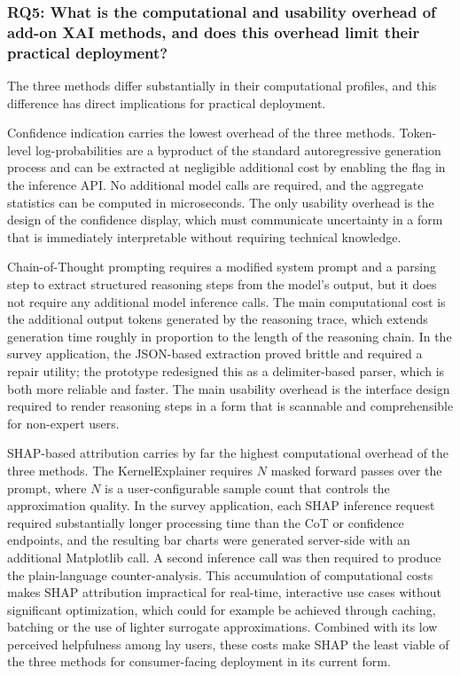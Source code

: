 \subsubsection*{RQ5: What is the computational and usability overhead of add-on XAI methods, and does this overhead limit their practical deployment?}

The three methods differ substantially in their computational profiles, and this difference has direct implications for practical deployment.

Confidence indication carries the lowest overhead of the three methods. Token-level log-probabi\-li\-ties are a byproduct of the standard autoregressive generation process and can be extracted at negligible additional cost by enabling the  flag in the inference API. No additional model calls are required, and the aggregate statistics can be computed in microseconds. The only usability overhead is the design of the confidence display, which must communicate uncertainty in a form that is immediately interpretable without requiring technical knowledge.

Chain-of-Thought prompting requires a modified system prompt and a parsing step to extract structured reasoning steps from the model's output, but it does not require any additional model inference calls. The main computational cost is the additional output tokens generated by the reasoning trace, which extends generation time roughly in proportion to the length of the reasoning chain. In the survey application, the JSON-based extraction proved brittle and required a repair utility; the prototype redesigned this as a delimiter-based parser, which is both more reliable and faster. The main usability overhead is the interface design required to render reasoning steps in a form that is scannable and comprehensible for non-expert users.

SHAP-based attribution carries by far the highest computational overhead of the three methods. The KernelExplainer requires $N$ masked forward passes over the prompt, where $N$ is a user-configurable sample count that controls the approximation quality. In the survey application, each SHAP inference request required substantially longer processing time than the CoT or confidence endpoints, and the resulting bar charts were generated server-side with an additional Matplotlib call. A second inference call was then required to produce the plain-language counter-analysis. This accumulation of computational costs makes SHAP attribution impractical for real-time, interactive use cases without significant optimization, which could for example be achieved through caching, batching or the use of lighter surrogate approximations. Combined with its low perceived helpfulness among lay users, these costs make SHAP the least viable of the three methods for consumer-facing deployment in its current form.

